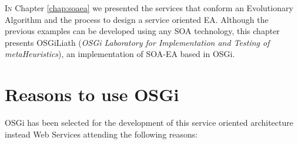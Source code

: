 \label{chap:osgiliath}
\minitoc\mtcskip
\vfill
\lettrine{I}{n} Chapter \ref{chap:soaea} we presented the services that conform an Evolutionary Algorithm and the process to design a service oriented EA. Although the previous examples can be developed using any SOA technology, this chapter presents OSGiLiath ({\em OSGi Laboratory for Implementation and Testing of metaHeuristics}), an implementation of SOA-EA based in OSGi. 

\section{Reasons to use OSGi}
OSGi has been selected for the development of this service oriented architecture instead Web Services  attending the following reasons:

